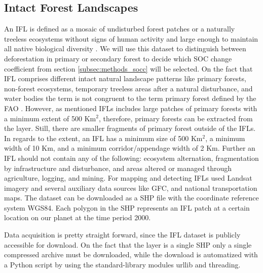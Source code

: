 	\subsection{Intact Forest Landscapes}
		An \ac{IFL} is defined as a mosaic of undisturbed forest patches or a naturally treeless ecosystems without signs of human activity and large enough to maintain all native biological diversity \citep{Potapov2017}. We will use this dataset to distinguish between deforestation in primary or secondary forest to decide which \ac{SOC} change coefficient from section \ref{subsec:methods_socc} will be selected. On the fact that \ac{IFL} comprises different intact natural landscape patterns like primary forests, non-forest ecosystems, temporary treeless areas after a natural disturbance, and water bodies the term is not congruent to the term primary forest defined by the \ac{FAO} \citep{FAO2012}. However, as mentioned \ac{IFL}s includes large patches of primary forests with a minimum extent of 500 Km$^2$, therefore, primary forests can be extracted from the layer. Still, there are smaller fragments of primary forest outside of the \ac{IFL}s. In regards to the extent, an \ac{IFL} has a minimum size of 500 Km$^2$, a minimum width of 10 Km, and a minimum corridor/appendage width of 2 Km. Further an \ac{IFL} should not contain any of the following: ecosystem alternation, fragmentation by infrastructure and disturbance, and areas altered or managed through agriculture, logging, and mining. For mapping and detecting \ac{IFL}s \citet{Potapov2017} used Landsat imagery and several auxiliary data sources like \ac{GFC}, and national transportation maps. The dataset can be downloaded as a \ac{SHP} file with the coordinate reference system \ac{WGS84}. Each polygon in the \ac{SHP} represents an \ac{IFL} patch at a certain location on our planet at the time period 2000.

		Data acquisition is pretty straight forward, since the \ac{IFL} dataset is publicly accessible for download. On the fact that the layer is a single \ac{SHP} only a single compressed archive must be downloaded, while the download is automatized with a Python script by using the standard-library modules urllib and threading.

